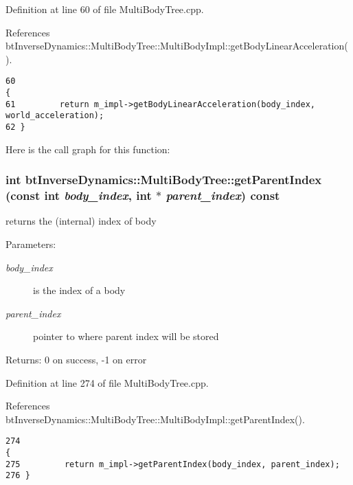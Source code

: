 Definition at line 60 of file MultiBodyTree.cpp.

References btInverseDynamics::MultiBodyTree::MultiBodyImpl::getBodyLinearAcceleration().

\begin{Code}\begin{verbatim}60                                                                                                  {
61         return m_impl->getBodyLinearAcceleration(body_index, world_acceleration);
62 }
\end{verbatim}
\end{Code}




Here is the call graph for this function:\hypertarget{classbt_inverse_dynamics_1_1_multi_body_tree_fc4f7fc8066ceaa8f666fbad2fcbd33d}{
\subsubsection[getParentIndex]{\setlength{\rightskip}{0pt plus 5cm}int btInverseDynamics::MultiBodyTree::getParentIndex (const int {\em body\_\-index}, \/  int $\ast$ {\em parent\_\-index}) const}}
\label{classbt_inverse_dynamics_1_1_multi_body_tree_fc4f7fc8066ceaa8f666fbad2fcbd33d}


returns the (internal) index of body \begin{Desc}
\item[Parameters:]
\begin{description}
\item[{\em body\_\-index}]is the index of a body \item[{\em parent\_\-index}]pointer to where parent index will be stored \end{description}
\end{Desc}
\begin{Desc}
\item[Returns:]0 on success, -1 on error \end{Desc}


Definition at line 274 of file MultiBodyTree.cpp.

References btInverseDynamics::MultiBodyTree::MultiBodyImpl::getParentIndex().

\begin{Code}\begin{verbatim}274                                                                                {
275         return m_impl->getParentIndex(body_index, parent_index);
276 }
\end{verbatim}
\end{Code}




